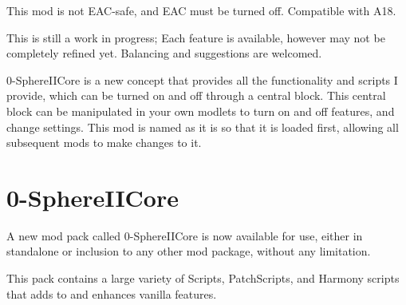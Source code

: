 This mod is not E\+A\+C-\/safe, and E\+AC must be turned off. Compatible with A18.

This is still a work in progress; Each feature is available, however may not be completely refined yet. Balancing and suggestions are welcomed.

0-\/Sphere\+I\+I\+Core is a new concept that provides all the functionality and scripts I provide, which can be turned on and off through a central block. This central block can be manipulated in your own modlets to turn on and off features, and change settings. This mod is named as it is so that it is loaded first, allowing all subsequent mods to make changes to it.\hypertarget{md__c_1__users_jkilpatrick__documents__git_hub__sphere_i_i_8_mods__r_e_a_d_m_e_mainpage}{}\section{0-\/\+Sphere\+I\+I\+Core }\label{md__c_1__users_jkilpatrick__documents__git_hub__sphere_i_i_8_mods__r_e_a_d_m_e_mainpage}
A new mod pack called 0-\/Sphere\+I\+I\+Core is now available for use, either in standalone or inclusion to any other mod package, without any limitation.

This pack contains a large variety of Scripts, Patch\+Scripts, and Harmony scripts that adds to and enhances vanilla features.

